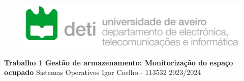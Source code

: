\begin{figure}
    \Centering
    \includegraphics[width=12cm]{deti.png}
    \vskip 3cm
\end{figure}
\begin{center}
    \Centering
    \huge{\textbf{Trabalho 1}}
    \newline
    \huge{\textbf{Gestão de armazenamento: \newline Monitorização do espaço ocupado}}
    \vskip 1cm
    \large{Sistemas Operativos}
    \vskip 2cm
    \large{Igor Coelho - 113532}
    \vfill
    \large{2023/2024}
\end{center}
\thispagestyle{empty}
